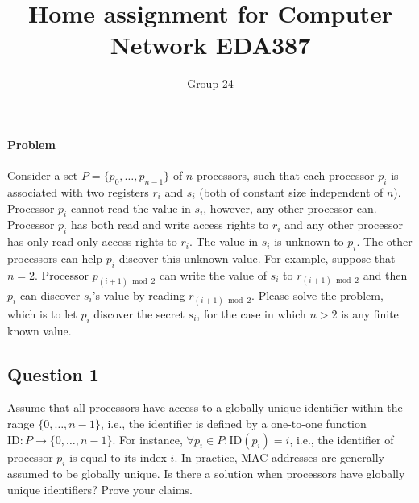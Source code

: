 \documentclass[12pt]{article}
\title{Home assignment for Computer Network EDA387}
\author{Group 24}
\begin{document}
\maketitle

\vspace{0.5in}

\paragraph{Problem}

Consider a set \(P=\{p_0,\ldots,p_{n-1}\}\) of \(n\) processors, such that each processor \(p_i\)
is associated with two registers \(r_i\) and \(s_i\) (both of constant size independent of \(n\)).
Processor \(p_i\) cannot read the value in \(s_i\), however, any other processor can. Processor \(p_i\)
has both read and write access rights to \(r_i\) and any other processor has only read-only
access rights to \(r_i\). The value in \(s_i\) is unknown to \(p_i\). The other processors can help \(p_i\)
discover this unknown value. For example, suppose that \(n=2\). Processor \(p_{(i+1)\bmod 2}\)
can write the value of \(s_i\) to \(r_{(i+1)\bmod 2}\) and then \(p_i\) can discover \(s_i\)'s value by reading
\(r_{(i+1)\bmod 2}\). Please solve the problem, which is to let \(p_i\) discover the secret \(s_i\),
for the case in which \(n>2\) is any finite known value.

\subsection*{Question 1}

Assume that all processors have access to a globally unique identifier
within the range $\{0, \ldots, n-1\}$, i.e., the identifier is defined by a one-to-one function
$\mathrm{ID}: P \to \{0, \ldots, n-1\}$. For instance, $\forall p_i \in P: \mathrm{ID}(p_i)=i$, i.e., the identifier of
processor $p_i$ is equal to its index $i$. In practice, MAC addresses are generally assumed to
be globally unique. Is there a solution when processors have globally unique identifiers?
Prove your claims.

\bigskip
\end{document}
